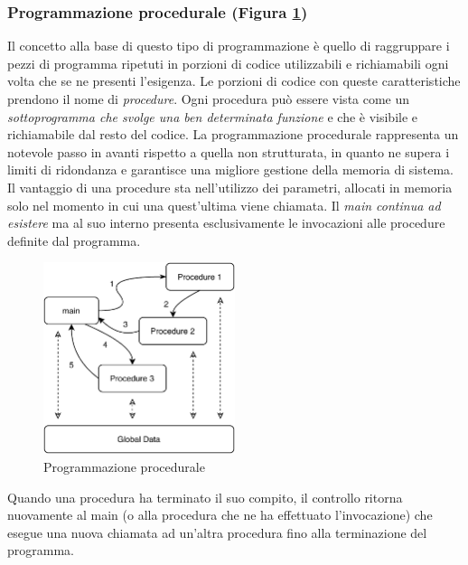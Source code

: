 \subsubsection{Programmazione procedurale (Figura \ref{fig:procedural-programming})}
Il concetto alla base di questo tipo di programmazione è quello di raggruppare i pezzi di programma ripetuti in porzioni di codice utilizzabili e richiamabili ogni volta che se ne presenti l’esigenza. Le porzioni di codice con queste caratteristiche prendono il nome di \textit{procedure}. Ogni procedura può essere vista come un \textit{sottoprogramma che svolge una ben determinata funzione} e che è visibile e richiamabile dal resto del codice. La programmazione procedurale rappresenta un notevole passo in avanti rispetto a quella non strutturata, in quanto ne supera i limiti di ridondanza e garantisce una migliore gestione della memoria di sistema. Il vantaggio di una procedure sta nell'utilizzo dei parametri, allocati in memoria solo nel momento in cui una quest'ultima viene chiamata. Il \textit{main continua ad esistere} ma al suo interno presenta esclusivamente le invocazioni alle procedure definite dal programma. 
\begin{figure}[H]
    \centering
    \includegraphics[width=0.50\textwidth]{images/01_2_procedural_programming.pdf}
    \caption{Programmazione procedurale}
    \label{fig:procedural-programming}
\end{figure}
Quando una procedura ha terminato il suo compito, il controllo ritorna nuovamente al main (o alla procedura che ne ha effettuato l’invocazione) che esegue una nuova chiamata ad un’altra procedura fino alla terminazione del programma.

